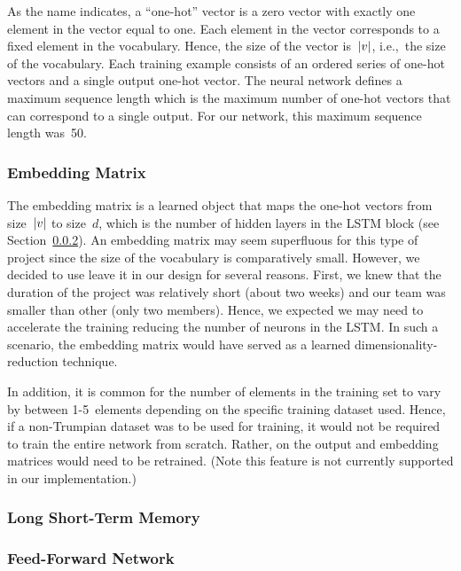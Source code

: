 \documentclass{article}
\DeclarePairedDelimiter\abs{\lvert}{\rvert}%
\begin{document}
As the name indicates, a ``one-hot'' vector is a zero vector with exactly one element in the vector equal to one.  Each element in the vector corresponds to a fixed element in the vocabulary.  Hence, the size of the vector is~$\abs{v}$, i.e.,~the size of the vocabulary. Each training example consists of an ordered series of one-hot vectors and a single output one-hot vector.  The neural network defines a maximum sequence length which is the maximum number of one-hot vectors that can correspond to a single output.  For our network, this maximum sequence length was~50.

\subsubsection{Embedding Matrix}

The embedding matrix is a learned object that maps the one-hot vectors from size~$\abs{v}$ to size~$d$, which is the number of hidden layers in the LSTM block (see Section~\ref{sec:lstm}).  An embedding matrix may seem superfluous for this type of project since the size of the vocabulary is comparatively small.  However, we decided to use leave it in our design for several reasons.  First, we knew that the duration of the project was relatively short (about two weeks) and our team was smaller than other (only two members).  Hence, we expected we may need to accelerate the training reducing the number of neurons in the LSTM.  In such a scenario, the embedding matrix would have served as a learned dimensionality-reduction technique.  

In addition, it is common for the number of elements in the training set to vary by between 1-5~elements depending on the specific training dataset used.  Hence, if a non-Trumpian dataset was to be used for training, it would not be required to train the entire network from scratch.  Rather, on the output and embedding matrices would need to be retrained. (Note this feature is not currently supported in our implementation.)


\subsubsection{Long Short-Term Memory}\label{sec:lstm}



\subsubsection{Feed-Forward Network}
\end{document}

